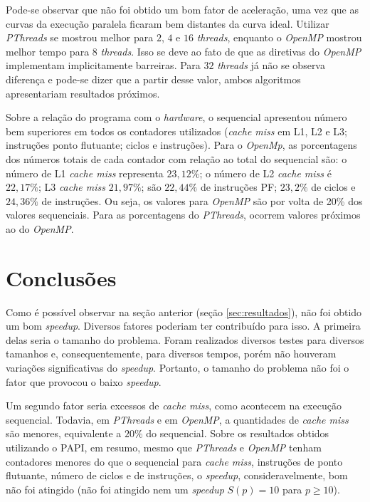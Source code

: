 \documentclass[12pt]{article}
\begin{document}
Pode-se observar que não foi obtido um bom fator de aceleração, uma vez que as curvas da execução paralela ficaram bem distantes da curva ideal. Utilizar \textit{PThreads} se mostrou melhor para $2$, $4$ e $16$ \textit{threads}, enquanto o \textit{OpenMP} mostrou melhor tempo para $8$ \textit{threads}. Isso se deve ao fato de que as diretivas do \textit{OpenMP} implementam implicitamente barreiras. Para $32$ \textit{threads} já não se observa diferença e pode-se dizer que a partir desse valor, ambos algoritmos apresentariam resultados próximos.

Sobre a relação do programa com o \textit{hardware}, o sequencial apresentou número bem superiores em todos os contadores utilizados (\textit{cache miss} em L1, L2 e L3; instruções ponto flutuante; ciclos e instruções). Para o \textit{OpenMp}, as porcentagens dos números totais de cada contador com relação ao total do sequencial são: o número de L1 \textit{cache miss} representa $23,12\%$; o número de L2 \textit{cache miss} é $22,17\%$; L3 \textit{cache miss} $21,97\%$; são $22,44\%$ de instruções PF; $23,2\%$ de ciclos e $24,36\%$ de instruções. Ou seja, os valores para \textit{OpenMP} são por volta de 20\% dos valores sequenciais. Para as porcentagens do \textit{PThreads}, ocorrem valores próximos ao do \textit{OpenMP}. 

\section{Conclusões}

Como é possível observar na seção anterior (seção \ref{sec:resultados}), não foi obtido um bom \textit{speedup}. Diversos fatores poderiam ter contribuído para isso. A primeira delas seria o tamanho do problema. Foram realizados diversos testes para diversos tamanhos e, consequentemente, para diversos tempos, porém não houveram variações significativas do \textit{speedup}. Portanto, o tamanho do problema não foi o fator que provocou o baixo \textit{speedup}.

Um segundo fator seria excessos de \textit{cache miss}, como acontecem na execução sequencial. Todavia, em \textit{PThreads} e em \textit{OpenMP}, a quantidades de \textit{cache miss} são menores, equivalente a $20\%$ do sequencial. Sobre os resultados obtidos utilizando o PAPI, em resumo, mesmo que \textit{PThreads} e \textit{OpenMP} tenham contadores menores do que o sequencial para \textit{cache miss}, instruções de ponto flutuante, número de ciclos e de instruções, o \textit{speedup}, consideravelmente, bom não foi atingido (não foi atingido nem um \textit{speedup} $S\left(p\right)=10$ para $p \geq 10$).  
\end{document}
